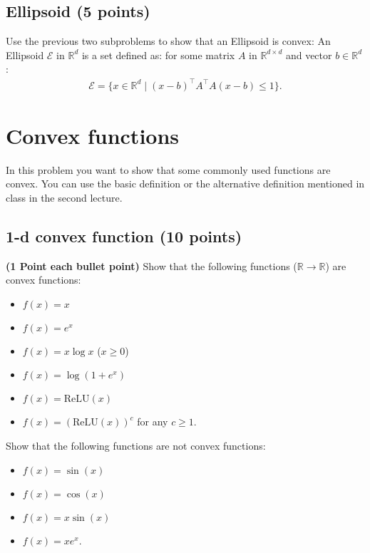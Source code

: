 \subsection{Ellipsoid (5 points)}

Use the previous two subproblems to show that an Ellipsoid is convex: An Ellipsoid $\mathcal{E}$ in $\mathbb{R}^d$ is a set defined as: for some matrix $A$ in $\mathbb{R}^{d \times d}$ and vector $b \in \mathbb{R}^d$: 
\begin{align}
\mathcal{E} = \{ x \in \mathbb{R}^d \mid (x - b)^{\top} A^{\top} A (x - b) \leq 1 \}.
\end{align}

\newpage
\section{Convex functions}
In this problem you want to show  that some commonly used functions are convex.   You can use the basic definition or the alternative definition mentioned in class in the second lecture. 


\subsection{1-d convex function (10 points)}

\textbf{(1 Point each bullet point)} Show that the following functions ($\mathbb{R} \to \mathbb{R}$) are convex functions:
\begin{itemize}
    \item $f(x) = x$
    \item $f(x) = e^x$
    \item $f(x) = x \log x$ ($x \geq 0$)
    \item $f(x) = \log(1 + e^x)$
    \item $f(x) = \text{ReLU}(x)$
    \item $f(x) = (\text{ReLU}(x) )^c$ for any $c \geq 1.$
\end{itemize}
Show that the following functions are not convex functions:
\begin{itemize}
    \item $f(x) = \sin (x)$
    \item $f(x)  = \cos (x)$
    \item $f(x) = x \sin (x)$
    \item $f(x) = x e^x.$
\end{itemize}




